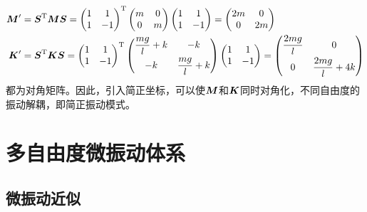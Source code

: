 \begin{align*}
	\boldsymbol{M}' & = \boldsymbol{S}^{\mathrm{T}} \boldsymbol{M} \boldsymbol{S} = \begin{pmatrix} 1 & 1 \\ 1 & -1 \end{pmatrix}^{\mathrm{T}} \begin{pmatrix} m & 0 \\ 0 & m \end{pmatrix} \begin{pmatrix} 1 & 1 \\ 1 & -1 \end{pmatrix} = \begin{pmatrix} 2m & 0 \\ 0 & 2m \end{pmatrix} \\
	\boldsymbol{K}' & = \boldsymbol{S}^{\mathrm{T}} \boldsymbol{K} \boldsymbol{S} = \begin{pmatrix} 1 & 1 \\ 1 & -1 \end{pmatrix}^{\mathrm{T}} \begin{pmatrix} \dfrac{mg}{l}+k & -k \\[1.5ex] -k & \dfrac{mg}{l}+k \end{pmatrix} \begin{pmatrix} 1 & 1 \\ 1 & -1 \end{pmatrix} = \begin{pmatrix} \dfrac{2mg}{l} & 0 \\[1.5ex] 0 & \dfrac{2mg}{l}+4k \end{pmatrix}
\end{align*}
都为对角矩阵。因此，引入简正坐标，可以使$\boldsymbol{M}$和$\boldsymbol{K}$同时对角化，不同自由度的振动解耦，即简正振动模式。

\section{多自由度微振动体系}

\subsection{微振动近似}

